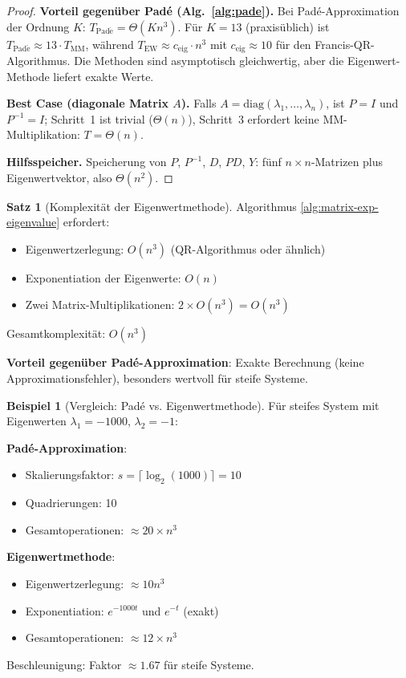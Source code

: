 \documentclass[a4paper,12pt]{report}
\theoremstyle{definition}
\newtheorem{beispiel}{Beispiel}
\newtheorem{satz}{Satz}
\begin{document}
\begin{proof}
		\textbf{Vorteil gegenüber Padé (Alg.~\ref{alg:pade}).} Bei Padé-Approximation der Ordnung $K$: $T_{\mathrm{Pad\acute{e}}} = \Theta(K n^3)$. Für $K = 13$ (praxisüblich) ist $T_{\mathrm{Pad\acute{e}}} \approx 13 \cdot T_{\mathrm{MM}}$, während $T_{\mathrm{EW}} \approx c_{\mathrm{eig}} \cdot n^3$ mit $c_{\mathrm{eig}} \approx 10$ für den Francis-QR-Algorithmus. Die Methoden sind asymptotisch gleichwertig, aber die Eigenwert-Methode liefert exakte Werte.

		\textbf{Best Case (diagonale Matrix $A$).} Falls $A = \mathrm{diag}(\lambda_1, \ldots, \lambda_n)$, ist $P = I$ und $P^{-1} = I$; Schritt~1 ist trivial ($\Theta(n)$), Schritt~3 erfordert keine MM-Multiplikation: $T = \Theta(n)$.

		\textbf{Hilfsspeicher.} Speicherung von $P$, $P^{-1}$, $D$, $PD$, $Y$: fünf $n{\times}n$-Matrizen plus Eigenwertvektor, also $\Theta(n^2)$.
	\end{proof}

	\begin{satz}[Komplexität der Eigenwertmethode]
		Algorithmus \ref{alg:matrix-exp-eigenvalue} erfordert:
		\begin{itemize}
			\item Eigenwertzerlegung: $O(n^3)$ (QR-Algorithmus oder ähnlich)
			\item Exponentiation der Eigenwerte: $O(n)$
			\item Zwei Matrix-Multiplikationen: $2 \times O(n^3) = O(n^3)$
		\end{itemize}
		
		Gesamtkomplexität: $O(n^3)$
		
		\textbf{Vorteil gegenüber Padé-Approximation}: Exakte Berechnung (keine Approximationsfehler), besonders wertvoll für steife Systeme.
	\end{satz}
	
	\begin{beispiel}[Vergleich: Padé vs. Eigenwertmethode]
		Für steifes System mit Eigenwerten $\lambda_1 = -1000$, $\lambda_2 = -1$:
		
		\textbf{Padé-Approximation}:
		\begin{itemize}
			\item Skalierungsfaktor: $s = \lceil \log_2(1000) \rceil = 10$
			\item Quadrierungen: 10
			\item Gesamtoperationen: $\approx 20 \times n^3$
		\end{itemize}
		
		\textbf{Eigenwertmethode}:
		\begin{itemize}
			\item Eigenwertzerlegung: $\approx 10 n^3$
			\item Exponentiation: $e^{-1000t}$ und $e^{-t}$ (exakt)
			\item Gesamtoperationen: $\approx 12 \times n^3$
		\end{itemize}
		
		Beschleunigung: Faktor $\approx 1.67$ für steife Systeme.
	\end{beispiel}
	
\end{document}
